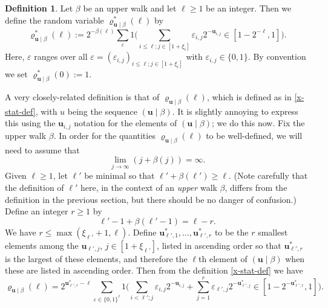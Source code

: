 \documentclass[11pt,reqno]{amsart}
\numberwithin{equation}{section}
\theoremstyle{definition}
\newtheorem{definition}[theorem]{Definition}
\theoremstyle{remark}
\newcommand{\mbf}{\mathbf}
\newcommand{\eps}{\varepsilon}
\renewcommand{\le}{\leqslant}
\renewcommand{\ge}{\geqslant}
\begin{document}
\begin{definition}\label{xbeta-ybeta-defs}
Let $\beta$ be an upper walk and let $\ell \ge 1$ be an integer. Then we define the random variable $\varrho^*_{\mbf{u} \mid \beta}(\ell)$ by \begin{equation} \varrho^*_{\mbf{u} \mid \beta}(\ell)  := 2^{-\beta(\ell)} \sum_{\eps} 1 \Big( \sum_{i \le \ell; j \in [1 + \xi_i]} \eps_{i,j}2^{-\mbf{u}_{i, j}} \in [1 - 2^{-\ell},1]\Big).\label{x-beta-form}\end{equation} Here, $\eps$ ranges over all $\eps = (\eps_{i,j})_{i \le \ell; j \in [1 + \xi_i]}$ with $\eps_{i,j} \in \{0,1\}$.
By convention we set $\varrho^*_{\mbf{u} \mid \beta}(0) := 1$. 
\end{definition}
A very closely-related definition is that of $\varrho_{\mbf{u} \mid \beta}(\ell)$, which is defined as in \cref{x-stat-def}, with $u$ being the sequence $(\mbf{u} \mid \beta)$. It is slightly annoying to express this using the $\mbf{u}_{i,j}$ notation for the elements of $(\mbf{u} \mid \beta)$; we do this now. Fix the upper walk $\beta$. In order for the quantities $\varrho_{\mbf{u} \mid \beta}(\ell)$ to be well-defined, we will need to assume that  
\begin{equation}\label{lim-betaupper-j-assump} \lim_{j \rightarrow \infty} (j + \beta(j)) = \infty.\end{equation}
Given $\ell \ge 1$, let $\ell'$ be minimal so that $\ell' + \beta(\ell') \ge \ell$. (Note carefully that the definition of $\ell'$ here, in the context of an \emph{upper} walk $\beta$, differs from the definition in the previous section, but there should be no danger of confusion.) Define an integer $r \ge 1$ by 
\begin{equation}\label{r-defn} \ell'-1 + \beta(\ell'-1) = \ell - r.\end{equation}
We have $r \le \max(\xi_{\ell'} + 1,\ell)$. Define $\mbf{u}^*_{\ell',1},\dots, \mbf{u}^*_{\ell', r}$ to be the $r$ smallest elements among the $\mbf{u}_{\ell', j}$, $j \in [1 + \xi_{\ell'}]$, listed in ascending order so that $\mbf{u}^*_{\ell', r}$ is the largest of these elements, and therefore the $\ell$th element of $(\mbf{u} \mid \beta)$ when these are listed in ascending order. Then from the definition \cref{x-stat-def} we have
\begin{equation}\label{rho-alt} \varrho_{\mbf{u} \mid \beta}(\ell) = 2^{\mbf{u}^*_{\ell',r} - \ell}\sum_{\eps \in \{0,1\}^{\ell}} 1 \big( \sum_{i < \ell'; j} \eps_{i,j} 2^{-\mbf{u}_{i,j}} + \sum_{j = 1}^r \eps_{\ell', j} 2^{-\mbf{u}^*_{\ell', j}} \in [1 - 2^{-\mbf{u}^*_{\ell', r}},1]\big).\end{equation}
\end{document}
